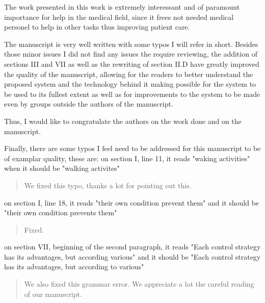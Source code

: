 \documentclass[journal,onecolumn,12pt]{IEEEtran}
\begin{document}
The work presented in this work is extremely interessant and of paramount importance for help in the medical field, since it frees not needed medical personel to help in other tasks thus improving patient care.

The manuscript is very well written with some typos I will refer in short. Besides those minor issues I did not find any issues the require reviewing, the addition of sections III and VII as well as the rewriting of section II.D have greatly improved the quality of the manuscript, allowing for the readers to better understand the proposed system and the technology behind it making possible for the system to be used to its fullest extent as well as for improvements to the system to be made even by groups outside the authors of the manuscript.

Thus, I would like to congratulate the authors on the work done and on the manuscript.

Finally, there are some typos I feel need to be addressed for this manuscript to be of examplar quality, these are:
on section I, line 11, it reads "waking activities" when it should be "walking activites"

\vspace{10pt} 
\begin{quotation}
{\color{blue}
We fixed this typo, thanks a lot for pointing out this.
}
\end{quotation}
\vspace{10pt} 

on section I, line 18, it reads "their own condition prevent them" and it should be "their own condition prevents them"

\vspace{10pt} 
\begin{quotation}
{\color{blue}
Fixed.
}
\end{quotation}
\vspace{10pt} 

on section VII, beginning of the second paragraph, it reads "Each control strategy has its advantages, but according various" and it should be "Each control strategy has its advantages, but according to various"

\vspace{10pt} 
\begin{quotation}
{\color{blue}
We also fixed this grammar error.  We appreciate a lot the careful reading of our manuscript.
}
\end{quotation}
\vspace{10pt} 
\end{document}
